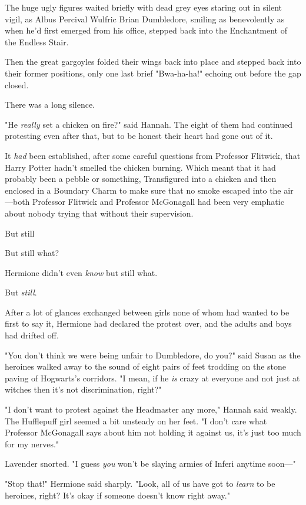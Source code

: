 The huge ugly figures waited briefly with dead grey eyes staring out in silent
vigil, as Albus Percival Wulfric Brian Dumbledore, smiling as benevolently as
when he'd first emerged from his office, stepped back into the Enchantment of
the Endless Stair.

Then the great gargoyles folded their wings back into place and stepped back
into their former positions, only one last brief "Bwa-ha-ha!" echoing out
before the gap closed.

There was a long silence.

"He \emph{really} set a chicken on fire?" said Hannah.
\sbreak
The eight of them had continued protesting even after that, but to be honest
their heart had gone out of it.

It \emph{had} been established, after some careful questions from Professor
Flitwick, that Harry Potter hadn't smelled the chicken burning. Which meant
that it had probably been a pebble or something, Transfigured into a chicken
and then enclosed in a Boundary Charm to make sure that no smoke escaped into
the air---both Professor Flitwick and Professor McGonagall had been very
emphatic about nobody trying that without their supervision.

But still{\el}

But still{\el} what?

Hermione didn't even \emph{know} but still what.

But \emph{still}.

After a lot of glances exchanged between girls none of whom had wanted to be
first to say it, Hermione had declared the protest over, and the adults and
boys had drifted off.

"You don't think we were being unfair to Dumbledore, do you?" said Susan as the
heroines walked away to the sound of eight pairs of feet trodding on the stone
paving of Hogwarts's corridors. "I mean, if he \emph{is} crazy at everyone and
not just at witches then it's not discrimination, right?"

"I don't want to protest against the Headmaster any more," Hannah said weakly.
The Hufflepuff girl seemed a bit unsteady on her feet. "I don't care what
Professor McGonagall says about him not holding it against us, it's just too
much for my nerves."

Lavender snorted. "I guess \emph{you} won't be slaying armies of Inferi anytime
soon---"

"Stop that!" Hermione said sharply. "Look, all of us have got to \emph{learn}
to be heroines, right? It's okay if someone doesn't know right away."

